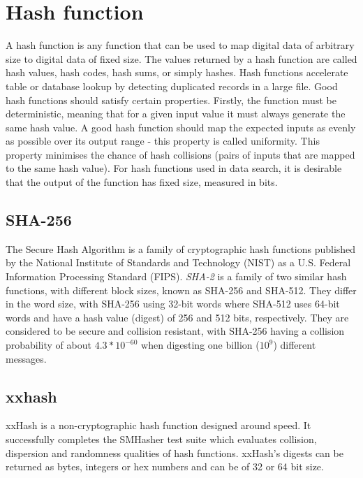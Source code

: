 \section{Hash function}
  A hash function is any function that can be used to map digital data of arbitrary size to digital data of fixed size. The values returned by a hash function are called hash values, hash codes, hash sums, or simply hashes. Hash functions accelerate table or database lookup by detecting duplicated records in a large file. Good hash functions should satisfy certain properties. Firstly, the function must be deterministic, meaning that for a given input value it must always generate the same hash value. A good hash function should map the expected inputs as evenly as possible over its output range - this property is called uniformity. This property minimises the chance of hash collisions (pairs of inputs that are mapped to the same hash value). For hash functions used in data search, it is desirable that the output of the function has fixed size, measured in bits.

  \subsection{SHA-256}
  The Secure Hash Algorithm is a family of cryptographic hash functions published by the National Institute of Standards and Technology (NIST) as a U.S. Federal Information Processing Standard (FIPS). \emph{SHA-2} is a family of two similar hash functions, with different block sizes, known as SHA-256 and SHA-512. They differ in the word size, with SHA-256 using 32-bit words where SHA-512 uses 64-bit words and have a hash value (digest) of 256 and 512 bits, respectively. They are considered to be secure and collision resistant, with SHA-256 having a collision probability of about $4.3*10^{-60}$ when digesting one billion ($10^9$) different messages.

  \subsection{xxhash}
  xxHash\cite{xxhash} is a non-cryptographic hash function designed around speed. It successfully completes the SMHasher test suite which evaluates collision, dispersion and randomness qualities of hash functions. xxHash's digests can be returned as bytes, integers or hex numbers and can be of 32 or 64 bit size.

